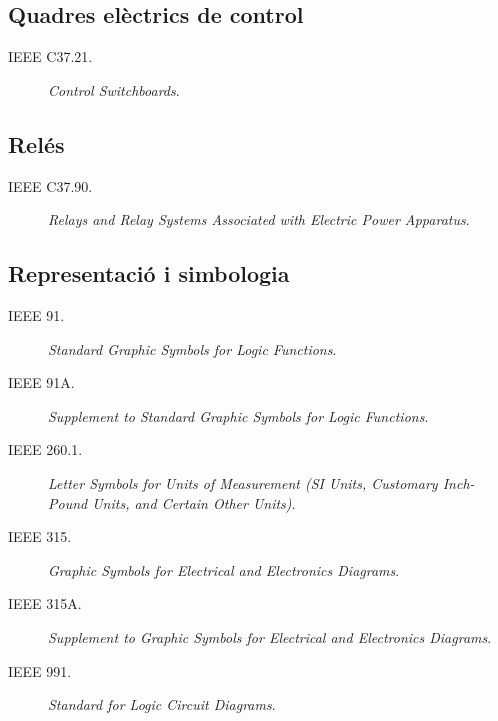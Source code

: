 \subsection*{Quadres elèctrics de control}
\begin{description}
	\item [\hspace{5mm}IEEE C37.21.] \textit{Control Switchboards}.
\end{description}


\subsection*{Relés}
\begin{description}
	\item [\hspace{5mm}IEEE C37.90.] \textit{Relays and Relay Systems Associated with Electric Power Apparatus}.
\end{description}


\subsection*{Representació i simbologia}
\begin{description}
	\item [\hspace{5mm}IEEE 91.] \textit{Standard Graphic Symbols for Logic Functions}.
	\item [\hspace{5mm}IEEE 91A.] \textit{Supplement to Standard Graphic Symbols for Logic Functions}.
	\item [\hspace{5mm}IEEE 260.1.] \textit{Letter Symbols for Units of Measurement (SI Units, Customary Inch-Pound Units, and Certain Other Units)}.
	\item [\hspace{5mm}IEEE 315.] \textit{Graphic Symbols for Electrical and Electronics Diagrams}.
	\item [\hspace{5mm}IEEE 315A.] \textit{Supplement to Graphic Symbols for Electrical and Electronics Diagrams}.
	\item [\hspace{5mm}IEEE 991.] \textit{Standard for Logic Circuit Diagrams}.
\end{description}

